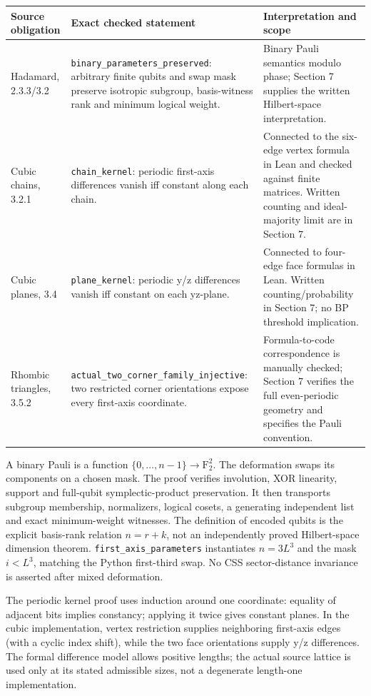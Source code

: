 \begin{longtable}{p{.20\linewidth}p{.35\linewidth}p{.35\linewidth}}
\toprule Source obligation & Exact checked statement & Interpretation and scope\\\midrule\endhead
Hadamard, 2.3.3/3.2 & \nolinkurl{binary_parameters_preserved}: arbitrary finite qubits and swap mask preserve isotropic subgroup, basis-witness rank and minimum logical weight. & Binary Pauli semantics modulo phase; Section 7 supplies the written Hilbert-space interpretation.\\
Cubic chains, 3.2.1 & \nolinkurl{chain_kernel}: periodic first-axis differences vanish iff constant along each chain. & Connected to the six-edge vertex formula in Lean and checked against finite matrices. Written counting and ideal-majority limit are in Section 7.\\
Cubic planes, 3.4 & \nolinkurl{plane_kernel}: periodic y/z differences vanish iff constant on each yz-plane. & Connected to four-edge face formulas in Lean. Written counting/probability in Section 7; no BP threshold implication.\\
Rhombic triangles, 3.5.2 & \nolinkurl{actual_two_corner_family_injective}: two restricted corner orientations expose every first-axis coordinate. & Formula-to-code correspondence is manually checked; Section 7 verifies the full even-periodic geometry and specifies the Pauli convention.\\
\bottomrule\end{longtable}

A binary Pauli is a function $\{0,\ldots,n-1\}\to\mathrm F_2^2$. The deformation swaps its components on a chosen mask. The proof verifies involution, XOR linearity, support and full-qubit symplectic-product preservation. It then transports subgroup membership, normalizers, logical cosets, a generating independent list and exact minimum-weight witnesses. The definition of encoded qubits is the explicit basis-rank relation $n=r+k$, not an independently proved Hilbert-space dimension theorem. \nolinkurl{first_axis_parameters} instantiates $n=3L^3$ and the mask $i<L^3$, matching the Python first-third swap. No CSS sector-distance invariance is asserted after mixed deformation.

The periodic kernel proof uses induction around one coordinate: equality of adjacent bits implies constancy; applying it twice gives constant planes. In the cubic implementation, vertex restriction supplies neighboring first-axis edges (with a cyclic index shift), while the two face orientations supply y/z differences. The formal difference model allows positive lengths; the actual source lattice is used only at its stated admissible sizes, not a degenerate length-one implementation.

